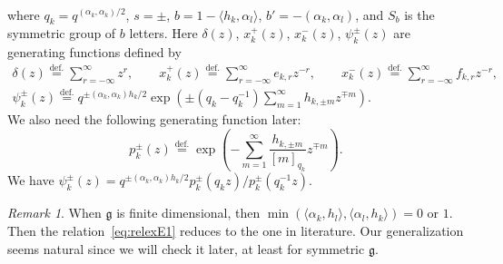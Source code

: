 \documentclass[12pt]{amsart}
\theoremstyle{definition}
\theoremstyle{remark}
\newtheorem{Remark}[equation]{Remark}
\numberwithin{equation}{subsection}
\newcommand{\defeq}{\overset{\operatorname{\scriptstyle def.}}{=}}
\begin{document}
{\begin{gather}
%
\end{gather}
where}
$q_k = q^{(\alpha_k,\alpha_k)/2}$,
$s = \pm$,
$b = 1-\langle h_k, \alpha_l\rangle$, 
$b' = - (\alpha_k,\alpha_l)$,
and 
$S_b$ is the symmetric group of $b$ letters.
%
Here $\delta(z)$, $x_k^+(z)$, $x_k^-(z)$, $\psi^{\pm}_{k}(z)$ are
generating functions defined by
{\allowdisplaybreaks[4]
\begin{gather*}
   \delta(z) \defeq \sum_{r=-\infty}^\infty z^{r}, \qquad
   x_k^+(z) \defeq \sum_{r=-\infty}^\infty e_{k,r} z^{-r}, \qquad
   x_k^-(z) \defeq \sum_{r=-\infty}^\infty f_{k,r} z^{-r}, \\
%
   \psi^{\pm}_k(z)
  \defeq q^{\pm (\alpha_k,\alpha_k)h_k/2}
   \exp\left(\pm (q_k-q_k^{-1})\sum_{m=1}^\infty h_{k,\pm m} z^{\mp m}\right).
\end{gather*}
We} also need the following generating function later:
\begin{equation*}
   p_k^\pm(z) \defeq 
   \exp\left(
     - \sum_{m=1}^\infty \frac{h_{k,\pm m}}{[m]_{q_k}} z^{\mp m}
   \right).
\end{equation*}
We have
\(
  \psi^{\pm}_k(z) = q^{\pm (\alpha_k,\alpha_k)h_k/2}
  p_k^\pm(q_k z)/p_k^\pm(q_k^{-1} z).
\)

\begin{Remark}
When $\mathfrak g$ is finite dimensional, then $\min(\langle \alpha_k,
h_l\rangle, \langle \alpha_l, h_k\rangle) = \text{$0$ or $1$}$. Then
the relation~\eqref{eq:relexE1} reduces to the one in literature. Our
generalization seems natural since we will check it later, at least
for symmetric $\mathfrak g$.
\end{Remark}
\end{document}
